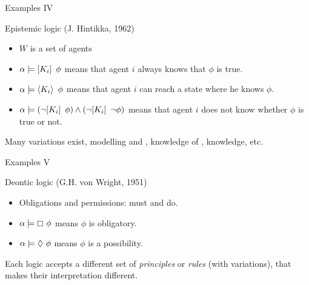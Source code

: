 \documentclass[aspectratio=169]{beamer}
\begin{document}
\begin{slide}{Examples IV}\label{s:19}
\small
\begin{block}{Epistemic logic (J. Hintikka, 1962)}
\begin{itemize}
\item $W$ is a set of agents 
\item $\alpha \models [K_i]\,~\phi$ means that agent $i$ always knows that $\phi$ is true.
\item $\alpha \models \langle K_i \rangle\,~\phi$ means that agent $i$ can reach a state where he knows $\phi$.
\item $\alpha \models (\lnot [K_i]\,~\phi) \land (\lnot [K_i]\,~\lnot \phi)$ means that agent $i$ does not know whether $\phi$ is true or not.
\end{itemize}
\end{block}

Many variations exist, modelling  and , knowledge of ,  knowledge, etc.

\end{slide}


\begin{slide}{Examples V}\label{s:20}
\small
\begin{block}{Deontic logic (G.H. von Wright, 1951)}
\begin{itemize}
\item Obligations and permissions: \alert{must} and  do.
\item $\alpha \models \boxempty~\phi$ means $\phi$ is obligatory.
\item $\alpha \models \Diamond~\phi$ means $\phi$ is a possibility.
\end{itemize}
\end{block}

Each logic accepts a different set of \emph{principles} or \emph{rules} (with variations), that makes their interpretation different.

\end{slide}
\end{document}
